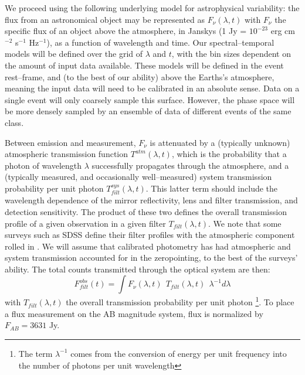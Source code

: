 We proceed using the following underlying model for astrophysical variability:
the flux from an astronomical object may be represented as $F_\nu(\lambda, t)$
with $F_\nu$ the specific flux of an object above the atmosphere, in Janskys (1
Jy = $10^{-23}$ erg cm$^{-2}$ s$^{-1}$ Hz$^{-1}$), as a function of wavelength
and time.  Our spectral--temporal models will be defined over the grid of
$\lambda$ and $t$, with the bin sizes dependent on the amount of input data
available.  These models will be defined in the event rest--frame, and (to the
best of our ability) above the Earths's atmosphere, meaning the input data will
need to be calibrated in an absolute sense. Data on a single event will only
coarsely sample this surface.  However, the phase space will be more densely
sampled by an ensemble of data of different events of the same class.

Between emission and measurement, $F_\nu$ is attenuated by a (typically unknown)
atmospheric transmission function $T^{atm}(\lambda, t)$, which is the
probability that a photon of wavelength $\lambda$ successfully propagates
through the atmosphere, and a (typically measured, and occasionally
well--measured) system transmission probability per unit photon
$T^{sys}_{filt}(\lambda, t)$.  This latter term should include the wavelength
dependence of the mirror reflectivity, lens and filter transmission, and
detection sensitivity.  The product of these two defines the overall
transmission profile of a given observation in a given filter $T_{filt}(\lambda,
t)$.  We note that some surveys such as SDSS define their filter profiles with
the atmospheric component rolled in \citep{2007AJ....134..973I}.  We will assume
that calibrated photometry has had atmospheric and system transmission accounted
for in the zeropointing, to the best of the surveys' ability.  The total counts
transmitted through the optical system are then: $$F^{obs}_{filt} (t) = \int
F_\nu(\lambda, t) ~~ T_{filt} (\lambda, t) ~~ \lambda^{-1} d\lambda$$ with
$T_{filt}(\lambda, t)$  the overall transmission probability per unit photon
\footnote{The term $\lambda^{-1}$ comes from the conversion of energy per unit
frequency into the number of photons per unit wavelength}. To place a flux
measurement on the AB magnitude system, flux is normalized by $F_{AB} = 3631$
Jy.

